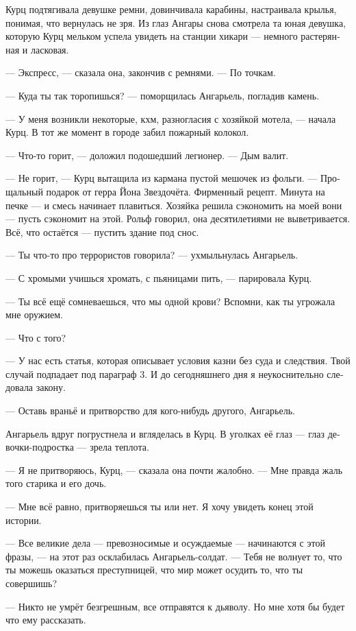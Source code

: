 \documentclass[a4paper,12pt,fleqn]{book}\usepackage{cooltooltips}\usepackage{polyglossia}\setdefaultlanguage[babelshorthands=true]{russian}\setotherlanguage{english}\defaultfontfeatures{Ligatures=TeX,Mapping=tex-text} \usepackage{xcolor}\definecolor{lightgray}{HTML}{bbbbbb}\color{lightgray}\newcommand{\ml}[3]{\textenglish{\textcolor{black}{#3}}}
\begin{document}
Курц подтягивала девушке ремни, довинчивала карабины, настраивала крылья, понимая, что вернулась не зря.
Из глаз Ангары снова смотрела та юная девушка, которую Курц мельком успела увидеть на станции хикари --- немного растерянная и ласковая.

--- Экспресс, --- сказала она, закончив с ремнями.
--- По точкам.

--- Куда ты так торопишься? --- поморщилась Ангарьель, погладив камень.

--- У меня возникли некоторые, кхм, разногласия с хозяйкой мотела, --- начала Курц.
В тот же момент в городе забил пожарный колокол.

--- Что-то горит, --- доложил подошедший легионер.
--- Дым валит.

--- Не горит, --- Курц вытащила из кармана пустой мешочек из фольги.
--- Прощальный подарок от герра Йона Звездочёта.
Фирменный рецепт.
Минута на печке --- и смесь начинает плавиться.
Хозяйка решила сэкономить на моей вони --- пусть сэкономит на этой.
Рольф говорил, она десятилетиями не выветривается.
Всё, что остаётся --- пустить здание под снос.

--- Ты что-то про террористов говорила? --- ухмыльнулась Ангарьель.

--- С хромыми учишься хромать, с пьяницами пить, --- парировала Курц.

--- Ты всё ещё сомневаешься, что мы одной крови?
Вспомни, как ты угрожала мне оружием.

--- Что с того?

--- У нас есть статья, которая описывает условия казни без суда и следствия.
Твой случай подпадает под параграф 3.
И до сегодняшнего дня я неукоснительно следовала закону.

--- Оставь враньё и притворство для кого-нибудь другого, Ангарьель.

Ангарьель вдруг погрустнела и вгляделась в Курц.
В уголках её глаз --- глаз девочки-подростка --- зрела теплота.

--- Я не притворяюсь, Курц, --- сказала она почти жалобно.
--- Мне правда жаль того старика и его дочь.

--- Мне всё равно, притворяешься ты или нет.
Я хочу увидеть конец этой истории.

--- Все великие дела --- превозносимые и осуждаемые --- начинаются с этой фразы, --- на этот раз осклабилась Ангарьель-солдат.
--- Тебя не волнует то, что ты можешь оказаться преступницей, что мир может осудить то, что ты совершишь?

--- Никто не умрёт безгрешным, все отправятся к дьяволу.
Но мне хотя бы будет что ему рассказать.
\end{document}
